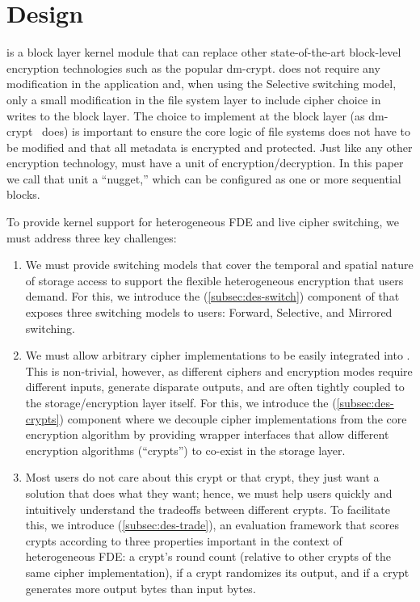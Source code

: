 \section{\sys Design}\label{sec:des}

\sys is a block layer kernel module that can replace other state-of-the-art
block-level encryption technologies such as the popular dm-crypt. \sys does not
require any modification in the application and, when using the Selective
switching model, only a small modification in the file system layer to include
cipher choice in writes to the block layer. The choice to implement \sys at the
block layer (as dm-crypt~\cite{dmcrypt} does) is important to ensure the core
logic of file systems does not have to be modified and that all metadata is
encrypted and protected. Just like any other encryption technology, \sys must
have a unit of encryption/decryption. In this paper we call that unit a
``nugget,'' which can be configured as one or more sequential blocks.

To provide kernel support for heterogeneous FDE and live cipher switching, we
must address three key challenges:

\begin{enumerate}

\item We must provide switching models that cover the temporal and spatial
  nature of storage access to support the flexible heterogeneous encryption that
  users demand. For this, we introduce the \sysA (\cref{subsec:des-switch})
  component of \sys that exposes three switching models to users: Forward,
  Selective, and Mirrored switching.

\item We must allow arbitrary cipher implementations to be easily integrated
  into \sys. This is non-trivial, however, as different ciphers and encryption
  modes require different inputs, generate disparate outputs, and are often
  tightly coupled to the storage/encryption layer itself. For this, we introduce
  the \sysB (\cref{subsec:des-crypts}) component where we decouple cipher
  implementations from the core encryption algorithm by providing wrapper
  interfaces that allow different encryption algorithms (``crypts'') to
  co-exist in the storage layer.

\item Most users do not care about this crypt or that crypt, they just want a
  solution that does what they want; hence, we must help users quickly and
  intuitively understand the tradeoffs between different crypts. To facilitate
  this, we introduce \sysC (\cref{subsec:des-trade}), an evaluation framework
  that scores crypts according to three properties important in the context of
  heterogeneous FDE: a crypt's round count (relative to other crypts of the same
  cipher implementation), if a crypt randomizes its output, and if a crypt
  generates more output bytes than input bytes.

\end{enumerate}

